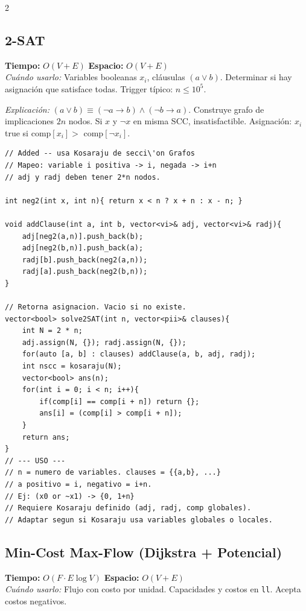 \documentclass[10pt,a4paper]{article}
\begin{document}
\begin{multicols}{2}

\subsection{2-SAT}
\textbf{Tiempo:} $O(V + E)$ \quad \textbf{Espacio:} $O(V + E)$\\
\textit{Cu\'ando usarlo:} Variables booleanas $x_i$, cl\'ausulas $(a \lor b)$. Determinar si hay asignaci\'on que satisface todas. Trigger t\'ipico: $n \leq 10^5$.

\textit{Explicaci\'on:} $(a \lor b) \equiv (\neg a \to b) \land (\neg b \to a)$. Construye grafo de implicaciones $2n$ nodos. Si $x$ y $\neg x$ en misma SCC, insatisfactible. Asignaci\'on: $x_i$ true si comp$[x_i] >$ comp$[\neg x_i]$.

\begin{lstlisting}
// Added -- usa Kosaraju de secci\'on Grafos
// Mapeo: variable i positiva -> i, negada -> i+n
// adj y radj deben tener 2*n nodos.

int neg2(int x, int n){ return x < n ? x + n : x - n; }

void addClause(int a, int b, vector<vi>& adj, vector<vi>& radj){
    adj[neg2(a,n)].push_back(b);
    adj[neg2(b,n)].push_back(a);
    radj[b].push_back(neg2(a,n));
    radj[a].push_back(neg2(b,n));
}

// Retorna asignacion. Vacio si no existe.
vector<bool> solve2SAT(int n, vector<pii>& clauses){
    int N = 2 * n;
    adj.assign(N, {}); radj.assign(N, {});
    for(auto [a, b] : clauses) addClause(a, b, adj, radj);
    int nscc = kosaraju(N);
    vector<bool> ans(n);
    for(int i = 0; i < n; i++){
        if(comp[i] == comp[i + n]) return {};
        ans[i] = (comp[i] > comp[i + n]);
    }
    return ans;
}
// --- USO ---
// n = numero de variables. clauses = {{a,b}, ...}
// a positivo = i, negativo = i+n.
// Ej: (x0 or ~x1) -> {0, 1+n}
// Requiere Kosaraju definido (adj, radj, comp globales).
// Adaptar segun si Kosaraju usa variables globales o locales.
\end{lstlisting}

\subsection{Min-Cost Max-Flow (Dijkstra + Potencial)}
\textbf{Tiempo:} $O(F \cdot E \log V)$ \quad \textbf{Espacio:} $O(V + E)$\\
\textit{Cu\'ando usarlo:} Flujo con costo por unidad. Capacidades y costos en \texttt{ll}. Acepta costos negativos.


\end{multicols}
\end{document}

